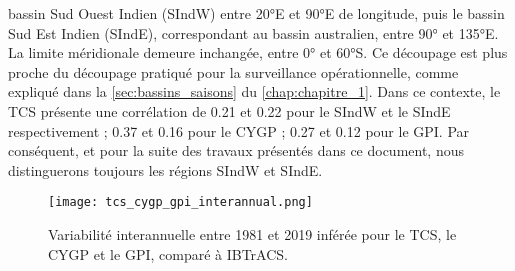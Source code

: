 \documentclass[../main.tex]{subfiles}
\begin{document}
bassin Sud Ouest Indien (SIndW) entre \ang{20}E et \ang{90}E de longitude, puis le bassin Sud Est Indien (SIndE), correspondant au bassin australien, entre
\ang{90} et \ang{135}E. La limite méridionale demeure inchangée, entre \ang{0} et \ang{60}S. Ce découpage est plus proche du découpage pratiqué pour la
surveillance opérationnelle, comme expliqué dans la \cref{sec:bassins_saisons} du \cref{chap:chapitre_1}. Dans ce contexte, le TCS présente une corrélation de
\num{0.21} et \num{0.22} pour le SIndW et le SIndE respectivement ; \num{0.37} et \num{0.16} pour le CYGP ; \num{0.27} et \num{0.12} pour le GPI. Par
conséquent, et pour la suite des travaux présentés dans ce document, nous distinguerons toujours les régions SIndW et SIndE.

\begin{figure}[tb]
    \centering
    \texttt{[image: tcs\_cygp\_gpi\_interannual.png]}
    \caption{Variabilité interannuelle entre 1981 et 2019 inférée pour le TCS, le CYGP et le GPI, comparé à IBTrACS.}
    \label{fig:tcs_cygp_gpi_variabilite}
\end{figure}
\end{document}
